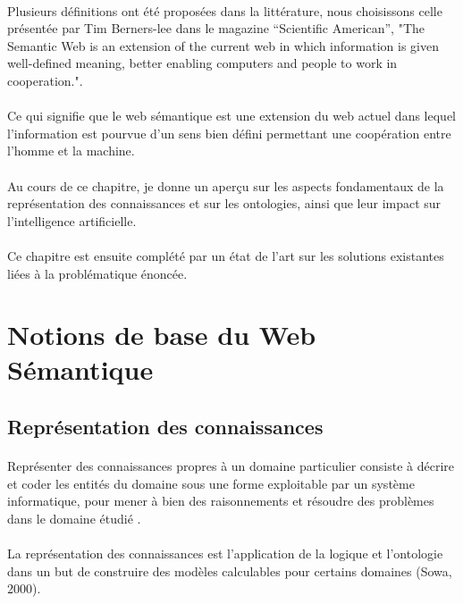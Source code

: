 \documentclass[12pt, a4paper, oneside]{book}
\begin{document}
\paragraph{}
Plusieurs définitions ont été proposées dans la littérature, nous choisissons celle présentée par Tim Berners-lee dans le magazine “Scientific American”, "The Semantic Web is an extension of the current web in which information is given well-defined meaning, better enabling computers and people to work in cooperation.". \citep{defOnto}
\paragraph{}
Ce qui signifie que le web sémantique est une extension du web actuel dans lequel l'information est pourvue d'un sens bien défini permettant une coopération entre l'homme et la machine. 
\paragraph{}
Au cours de ce chapitre, je donne un aperçu sur les aspects fondamentaux de la représentation des connaissances et sur les ontologies, ainsi que leur impact sur l'intelligence artificielle.
\paragraph{}
Ce chapitre est ensuite complété par un état de l'art sur les solutions existantes liées à la problématique énoncée.

\section{Notions de base du Web Sémantique}

\subsection{Représentation des connaissances}
\paragraph{}
Représenter des connaissances propres à un domaine particulier consiste à décrire
et coder les entités du domaine sous une forme exploitable par un système
informatique, pour mener à bien des raisonnements et résoudre des problèmes dans le
domaine étudié \citep{kayser}.
\paragraph{}
La représentation des connaissances est l'application
de la logique et l'ontologie dans un but de construire des modèles calculables pour
certains domaines (Sowa, 2000).
\end{document}
